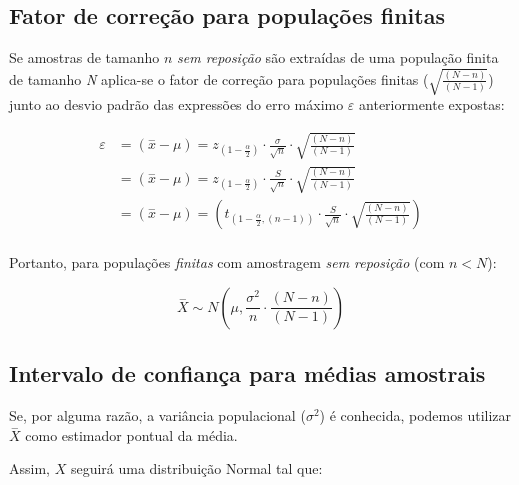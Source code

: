 \documentclass[
]{book}
\begin{document}
\hypertarget{fator-de-correuxe7uxe3o-para-populauxe7uxf5es-finitas}{%
\subsection{Fator de correção para populações finitas}\label{fator-de-correuxe7uxe3o-para-populauxe7uxf5es-finitas}}

\hfill\break

Se amostras de tamanho \(n\) \emph{sem reposição} são extraídas de uma população finita de tamanho \emph{N} aplica-se o fator de correção para populações finitas (\(\sqrt{\frac{(N-n)}{(N-1)}}\)) junto ao desvio padrão das expressões do erro máximo \(\varepsilon\) anteriormente expostas:

\begin{align*}
\varepsilon & =(\stackrel{-}{x}-\mu)={z}_{(1-\frac{\alpha }{2})} \cdot \frac{\sigma}{\sqrt{n}} \cdot \sqrt{\frac{(N-n)}{(N-1)}} \\
& =(\stackrel{-}{x}-\mu)={z}_{(1-\frac{\alpha }{2})} \cdot \frac{S}{\sqrt{n}} \cdot \sqrt{\frac{(N-n)}{(N-1)}}\\
& =(\stackrel{-}{x}-\mu)= ({t}_{(1-\frac{\alpha }{2}, (n-1))} \cdot \frac{S}{\sqrt{n}} \cdot \sqrt{\frac{(N-n)}{(N-1)}})\\
\end{align*}

\hfill\break

Portanto, para populações \emph{finitas} com amostragem \emph{sem reposição} (com \(n<N\)):

\hfill\break

\[
\stackrel{-}{X} \sim N(\mu,  \frac{\sigma^{2}}{n} \cdot \frac{(N-n)}{(N-1)}    )
\]

\hfill\break

\hypertarget{intervalo-de-confianuxe7a-para-muxe9dias-amostrais}{%
\subsection{Intervalo de confiança para médias amostrais}\label{intervalo-de-confianuxe7a-para-muxe9dias-amostrais}}

\hfill\break

Se, por alguma razão, a variância populacional (\(\sigma^{2}\)) é conhecida, podemos utilizar \(\stackrel{-}{X}\) como estimador pontual da média.

\hfill\break

Assim, \(X\) seguirá uma distribuição Normal tal que:
\end{document}
